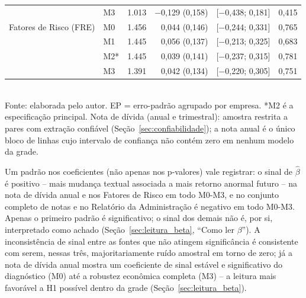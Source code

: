 \documentclass[a4paper,12pt]{report}
\begin{document}
\begin{table}[htbp]
\begin{tabular}{@{}llrrrr@{}}
                                     & M3 & 1.013 & $-$0,129 (0,158) & [$-$0,438; 0,181] & 0,415 \\
        Fatores de Risco (FRE)      & M0 & 1.456 & 0,044 (0,146) & [$-$0,244; 0,331] & 0,765 \\
                                     & M1 & 1.445 & 0,056 (0,137) & [$-$0,213; 0,325] & 0,683 \\
                                     & M2* & 1.445 & 0,039 (0,141) & [$-$0,237; 0,315] & 0,781 \\
                                     & M3 & 1.391 & 0,042 (0,134) & [$-$0,220; 0,305] & 0,751 \\
        \bottomrule
    \end{tabular}
    \\[0.3cm]
    {\footnotesize Fonte: elaborada pelo autor. EP = erro-padrão agrupado por empresa. *M2 é a especificação principal. Nota de dívida (anual e trimestral): amostra restrita a pares com extração confiável (Seção~\ref{sec:confiabilidade}); a nota anual é o único bloco de linhas cujo intervalo de confiança não contém zero em nenhum modelo da grade.}
\end{table}

Um padrão nos coeficientes (não apenas nos p-valores) vale registrar: o sinal de $\hat\beta$ é positivo -- mais mudança textual associada a mais retorno anormal futuro -- na nota de dívida anual e nos Fatores de Risco em todo M0-M3, e no conjunto completo de notas e no Relatório da Administração é negativo em todo M0-M3. Apenas o primeiro padrão é significativo; o sinal dos demais não é, por si, interpretado como achado (Seção~\ref{sec:leitura_beta}, ``Como ler $\beta$''). A inconsistência de sinal entre as fontes que não atingem significância é consistente com serem, nessas três, majoritariamente ruído amostral em torno de zero; já a nota de dívida anual mostra um coeficiente de sinal estável e significativo do diagnóstico (M0) até a robustez econômica completa (M3) -- a leitura mais favorável a H1 possível dentro da grade (Seção~\ref{sec:leitura_beta}).
\end{document}
